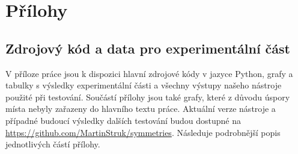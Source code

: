 \documentclass[12pt,a4paper]{report}
\begin{document}



\tableofcontents










\listoffigures



\ifx\ThesisType\TypePhD
{}
\fi

\appendix
\chapter{Přílohy}

\section{Zdrojový kód a data pro experimentální část}
V příloze práce jsou k dispozici hlavní zdrojové kódy v jazyce Python, grafy a tabulky s výsledky experimentální části a všechny výstupy našeho nástroje použité při testování. Součástí přílohy jsou také grafy, které z důvodu úspory místa nebyly zařazeny do hlavního textu práce. Aktuální verze nástroje a případné budoucí výsledky dalších testování budou dostupné na \url{https://github.com/MartinStruk/symmetries}. Následuje podrobnější popis jednotlivých částí přílohy.
\end{document}
